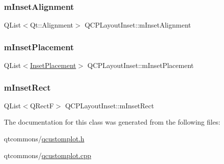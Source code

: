 \mbox{\label{class_q_c_p_layout_inset_a55e9b84c310136ff985a6544184ab64a}} 
\subsubsection{\texorpdfstring{mInsetAlignment}{mInsetAlignment}}
{\footnotesize\ttfamily Q\+List$<$Qt\+::\+Alignment$>$ Q\+C\+P\+Layout\+Inset\+::m\+Inset\+Alignment\hspace{0.3cm}{\ttfamily [protected]}}

\mbox{\label{class_q_c_p_layout_inset_a57a0a4e445cc78eada29765ecf092abe}} 
\subsubsection{\texorpdfstring{mInsetPlacement}{mInsetPlacement}}
{\footnotesize\ttfamily Q\+List$<$\mbox{\hyperlink{class_q_c_p_layout_inset_a8b9e17d9a2768293d2a7d72f5e298192}{Inset\+Placement}}$>$ Q\+C\+P\+Layout\+Inset\+::m\+Inset\+Placement\hspace{0.3cm}{\ttfamily [protected]}}

\mbox{\label{class_q_c_p_layout_inset_aaa8f6b5029458f3d97a65239524a2b33}} 
\subsubsection{\texorpdfstring{mInsetRect}{mInsetRect}}
{\footnotesize\ttfamily Q\+List$<$Q\+RectF$>$ Q\+C\+P\+Layout\+Inset\+::m\+Inset\+Rect\hspace{0.3cm}{\ttfamily [protected]}}



The documentation for this class was generated from the following files\+:\begin{DoxyCompactItemize}
\item 
qtcommons/\mbox{\hyperlink{qcustomplot_8h}{qcustomplot.\+h}}\item 
qtcommons/\mbox{\hyperlink{qcustomplot_8cpp}{qcustomplot.\+cpp}}\end{DoxyCompactItemize}
